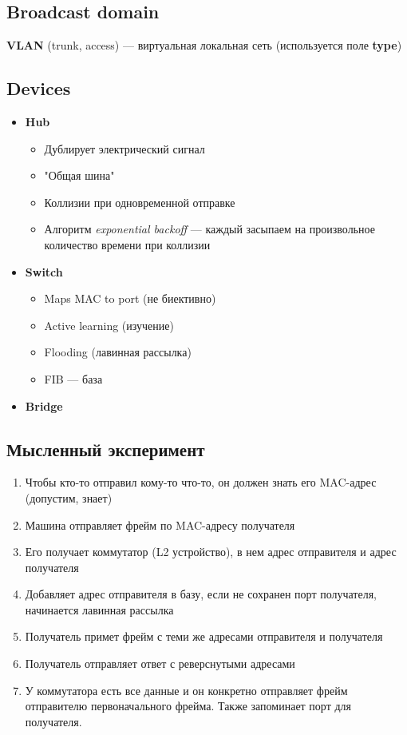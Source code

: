 \subsection{Broadcast domain}
\textbf{VLAN} (trunk, access) --- виртуальная локальная сеть (используется поле \textbf{type})

\subsection{Devices}
\begin{itemize}
    \item \textbf{Hub}
        \begin{itemize}
            \item Дублирует электрический сигнал
            \item "Общая шина"
            \item Коллизии при одновременной отправке
            \item Алгоритм \emph{exponential backoff} --- каждый засыпаем на произвольное количество времени при коллизии
        \end{itemize}
    \item \textbf{Switch}
        \begin{itemize}
            \item Maps MAC to port (не биективно)
            \item Active learning (изучение)
            \item Flooding (лавинная рассылка)
            \item FIB --- база
        \end{itemize}
    \item \textbf{Bridge}
\end{itemize}

\subsection{Мысленный эксперимент}
\begin{enumerate}
    \item Чтобы кто-то отправил кому-то что-то, он должен знать его MAC-адрес (допустим, знает)
    \item Машина отправляет фрейм по MAC-адресу получателя
    \item Его получает коммутатор (L2 устройство), в нем адрес отправителя и адрес получателя
    \item Добавляет адрес отправителя в базу, если не сохранен порт получателя, начинается лавинная рассылка
    \item Получатель примет фрейм с теми же адресами отправителя и получателя
    \item Получатель отправляет ответ с реверснутыми адресами
    \item У коммутатора есть все данные и он конкретно отправляет фрейм отправителю первоначального фрейма. Также запоминает порт для получателя.
\end{enumerate}


